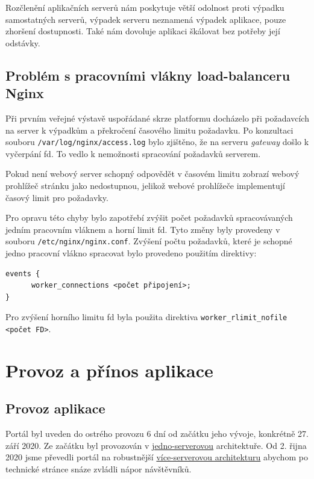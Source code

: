 Rozčlenění aplikačních serverů nám poskytuje větší odolnost proti výpadku samostatných serverů, výpadek serveru neznamená výpadek aplikace, pouze zhoršení dostupnosti.
Také nám dovoluje aplikaci škálovat bez potřeby její odstávky.

\subsection{Problém s pracovními vlákny load-balanceru Nginx}\label{sub:poor-nginx}

Při prvním veřejné výstavě uspořádané skrze platformu \bso{} docházelo při požadavcích na server k výpadkům a překročení časového limitu požadavku.
Po konzultaci souboru \verb|/var/log/nginx/access.log| bylo zjištěno, že na serveru \textit{gateway} došlo k vyčerpání \acrshort{fd}.
To vedlo k nemožnosti spracování požadavků serverem.

Pokud není webový server schopný odpovědět v časovém limitu zobrazí webový prohlížeč stránku jako nedostupnou,
jelikož webové prohlížeče implementují časový limit pro požadavky\cite{browser-timeout}.

Pro opravu této chyby bylo zapotřebí zvýšit počet požadavků spracovávaných jedním pracovním vláknem a horní limit \acrshort{fd}.
Tyto změny byly provedeny v souboru \verb|/etc/nginx/nginx.conf|.
Zvýšení počtu požadavků, které je schopné jedno pracovní vlákno spracovat bylo provedeno použitím direktivy:
\begin{verbatim}
events {
      worker_connections <počet připojení>;
}
\end{verbatim}
Pro zvýšení horního limitu \acrshort{fd} byla použita direktiva \verb|worker_rlimit_nofile <počet FD>|.

\section{Provoz a přínos aplikace}

\subsection{Provoz aplikace}

Portál byl uveden do ostrého provozu 6 dní od začátku jeho vývoje, konkrétně 27. září 2020.
Ze začátku byl provozován v \hyperref[sub:one-server]{jedno-serverovou} architektuře.
Od 2. řijna 2020 jsme převedli portál na robustnější \hyperref[sub:multi-server]{více-serverovou architekturu}
abychom po technické stránce snáze zvládli nápor návštěvníků. 

